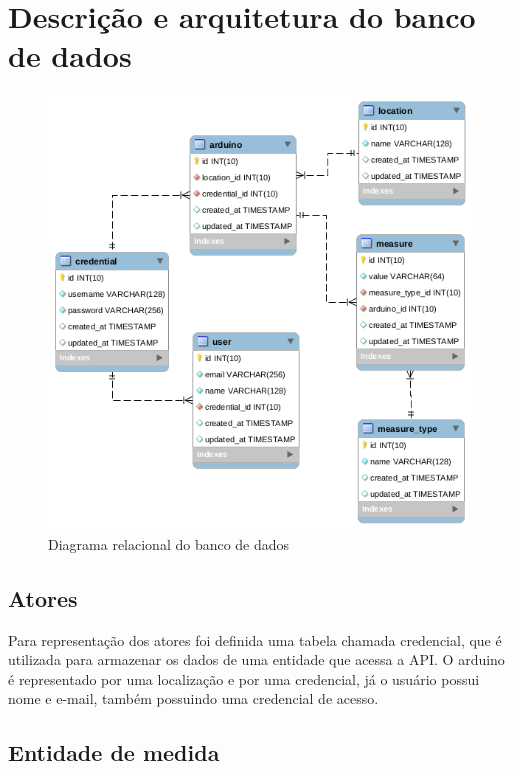 \chapter{Descrição e arquitetura do banco de dados}

\begin{figure}[H]
    \label{figure_diagrama_bd_relacional}
    \centering
    \caption{Diagrama relacional do banco de dados}
    \includegraphics[scale=0.6]{database/scheme.png}
    \hfill
\end{figure}

\section{Atores}

Para representação dos atores foi definida uma tabela chamada credencial, que é utilizada para armazenar os dados de uma entidade que acessa a API.
O arduino é representado por uma localização e por uma credencial, já o usuário possui nome e e-mail, também possuindo uma credencial de acesso.

\section{Entidade de medida}

